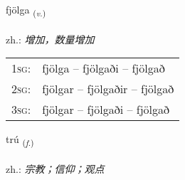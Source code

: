 \documentclass[frontgrid, backgrid]{flacards}\usepackage[]{graphicx}\usepackage[]{xcolor}
\begin{document}
\renewcommand{\flhead}{\vskip5pt \fboxsep=0pt {\small\bfseries\footnotesize Sagnorð | 动词}}
\renewcommand{\fcfoot}{\vskip5pt \fboxsep=0pt \hspace{2pt}{\small\bfseries\footnotesize 1K}}

\renewcommand{\blhead}{\vskip5pt {\small\bfseries\footnotesize Sagnorð | 动词 }}
\renewcommand{\bcfoot}{\vskip5pt \hspace{2pt}{\small\bfseries\footnotesize 1K}}


{fjölga \small{\textsubscript{(\textit{v.})}} \\[1ex] %
\textphonetic{[fjœlka]} \\
zh.: \emph{增加，数量增加} \\  [2ex]
\renewcommand*{\arraystretch}{0.8}
\begin{tabular}{p{1cm}l}
\textsc{1sg}: & fjölga -- fjölgaði -- fjölgað \\ 
\textsc{2sg}: & fjölgar -- fjölgaðir -- fjölgað \\ 
\textsc{3sg}: & fjölgar -- fjölgaði -- fjölgað \\ 
\end{tabular}
}

\renewcommand{\flhead}{\vskip5pt \fboxsep=0pt {\small\bfseries\footnotesize Nafnorð | 名词}}
\renewcommand{\fcfoot}{\vskip5pt \fboxsep=0pt \hspace{2pt}{\small\bfseries\footnotesize 1K}}

\renewcommand{\blhead}{\vskip5pt {\small\bfseries\footnotesize Nafnorð | 名词 }}
\renewcommand{\bcfoot}{\vskip5pt \hspace{2pt}{\small\bfseries\footnotesize 1K}}


{trú \small{\textsubscript{(\textit{f.})}} \\[1ex] %
\textphonetic{[tʰruː]} \\
zh.: \emph{宗教；信仰；观点} \\  [2ex]
\renewcommand*{\arraystretch}{0.8}
}
\end{document}
